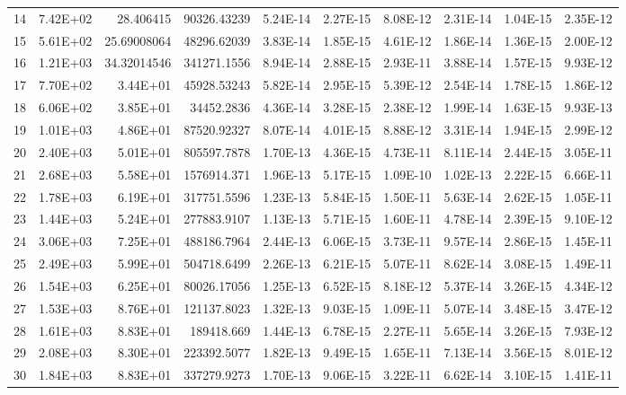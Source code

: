 \documentclass[12pt]{article}
\begin{document}
\begin{enumerate}
\begin{landscape}
\begin{table}[htbp]
\begin{tabular}{rrrrrrrrrr}
    14    & 7.42E+02 & 28.406415 & 90326.43239 & 5.24E-14 & 2.27E-15 & 8.08E-12 & 2.31E-14 & 1.04E-15 & 2.35E-12 \\
    15    & 5.61E+02 & 25.69008064 & 48296.62039 & 3.83E-14 & 1.85E-15 & 4.61E-12 & 1.86E-14 & 1.36E-15 & 2.00E-12 \\
    16    & 1.21E+03 & 34.32014546 & 341271.1556 & 8.94E-14 & 2.88E-15 & 2.93E-11 & 3.88E-14 & 1.57E-15 & 9.93E-12 \\
    17    & 7.70E+02 & 3.44E+01 & 45928.53243 & 5.82E-14 & 2.95E-15 & 5.39E-12 & 2.54E-14 & 1.78E-15 & 1.86E-12 \\
    18    & 6.06E+02 & 3.85E+01 & 34452.2836 & 4.36E-14 & 3.28E-15 & 2.38E-12 & 1.99E-14 & 1.63E-15 & 9.93E-13 \\
    19    & 1.01E+03 & 4.86E+01 & 87520.92327 & 8.07E-14 & 4.01E-15 & 8.88E-12 & 3.31E-14 & 1.94E-15 & 2.99E-12 \\
    20    & 2.40E+03 & 5.01E+01 & 805597.7878 & 1.70E-13 & 4.36E-15 & 4.73E-11 & 8.11E-14 & 2.44E-15 & 3.05E-11 \\
    21    & 2.68E+03 & 5.58E+01 & 1576914.371 & 1.96E-13 & 5.17E-15 & 1.09E-10 & 1.02E-13 & 2.22E-15 & 6.66E-11 \\
    22    & 1.78E+03 & 6.19E+01 & 317751.5596 & 1.23E-13 & 5.84E-15 & 1.50E-11 & 5.63E-14 & 2.62E-15 & 1.05E-11 \\
    23    & 1.44E+03 & 5.24E+01 & 277883.9107 & 1.13E-13 & 5.71E-15 & 1.60E-11 & 4.78E-14 & 2.39E-15 & 9.10E-12 \\
    24    & 3.06E+03 & 7.25E+01 & 488186.7964 & 2.44E-13 & 6.06E-15 & 3.73E-11 & 9.57E-14 & 2.86E-15 & 1.45E-11 \\
    25    & 2.49E+03 & 5.99E+01 & 504718.6499 & 2.26E-13 & 6.21E-15 & 5.07E-11 & 8.62E-14 & 3.08E-15 & 1.49E-11 \\
    26    & 1.54E+03 & 6.25E+01 & 80026.17056 & 1.25E-13 & 6.52E-15 & 8.18E-12 & 5.37E-14 & 3.26E-15 & 4.34E-12 \\
    27    & 1.53E+03 & 8.76E+01 & 121137.8023 & 1.32E-13 & 9.03E-15 & 1.09E-11 & 5.07E-14 & 3.48E-15 & 3.47E-12 \\
    28    & 1.61E+03 & 8.83E+01 & 189418.669 & 1.44E-13 & 6.78E-15 & 2.27E-11 & 5.65E-14 & 3.26E-15 & 7.93E-12 \\
    29    & 2.08E+03 & 8.30E+01 & 223392.5077 & 1.82E-13 & 9.49E-15 & 1.65E-11 & 7.13E-14 & 3.56E-15 & 8.01E-12 \\
    30    & 1.84E+03 & 8.83E+01 & 337279.9273 & 1.70E-13 & 9.06E-15 & 3.22E-11 & 6.62E-14 & 3.10E-15 & 1.41E-11 \\
    \end{tabular}%
  \label{tab:addlabel}%
\end{table}%

  \end{landscape}

\end{enumerate}
\end{document}
